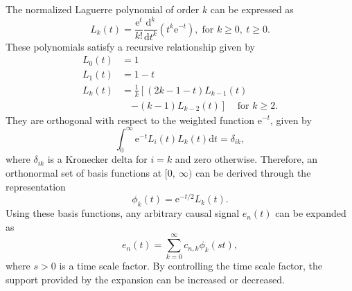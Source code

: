 \documentclass[conference, a4paper]{IEEEtran}
\begin{document}
The normalized Laguerre polynomial of order $k$ can be expressed as
\begin{equation}
L_k(t)=\frac{\mathrm{e}^t}{k!}\frac{\mathrm{d}^k}{\mathrm{d}t^k}(t^k\mathrm{e}^{-t}),\;
\text{for $k\ge 0,\:t\ge 0$}.
\end{equation}
These polynomials satisfy a recursive relationship given by
\begin{equation}
\begin{split}
L_0(t)&=1 \\
L_1(t)&=1-t \\
L_k(t)&=\frac{1}{k}\left [ (2k-1-t)L_{k-1}(t)\right . \\
 &\quad \left . -(k-1)L_{k-2}(t)\right ]
\;\;\;\;\text{for $k\ge 2$.}
\end{split}
\end{equation}
They are orthogonal with respect to the weighted function
$\mathrm{e}^{-t}$, given by
\begin{equation}
\int _{0}^{\infty}\mathrm{e}^{-t}L_i(t)L_k(t)\mathrm{d}t=\delta _{ik},
\end{equation}
where $\delta _{ik}$ is a Kronecker delta for $i=k$ and zero otherwise.
Therefore, an orthonormal set of basis functions at $[0,\:\infty)$ can be derived through
the representation
\begin{equation}
\phi _k(t)=\mathrm{e}^{-t/2}L_k(t).
\end{equation}
Using these basis functions, any arbitrary causal signal $e_n(t)$ can be
expanded as
\begin{equation}
e_n(t)=\sum _{k=0}^{\infty}c_{n,k}\phi _k(st),
\end{equation}
where $s>0$ is a time scale factor. By controlling the time scale
factor, the support provided by the expansion can be increased or
decreased.
\end{document}
